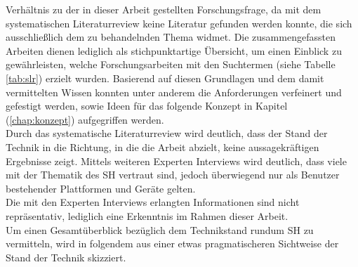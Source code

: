     Verhältnis zu der in dieser Arbeit gestellten Forschungsfrage, da mit dem systematischen Literaturreview keine Literatur 
    gefunden werden konnte, die sich ausschließlich dem zu behandelnden Thema widmet. Die zusammengefassten Arbeiten dienen 
    lediglich als stichpunktartige Übersicht, um einen Einblick zu gewährleisten, welche Forschungsarbeiten mit den 
    Suchtermen (siehe Tabelle \ref{tab:slr}) erzielt wurden. Basierend auf diesen Grundlagen und dem damit vermittelten Wissen 
    konnten unter anderem die Anforderungen verfeinert und gefestigt werden, sowie Ideen für das folgende Konzept in Kapitel 
    (\ref{chap:konzept}) aufgegriffen werden.
    \\ 
    Durch das systematische Literaturreview wird deutlich, dass der Stand der Technik in die Richtung, in die die Arbeit 
    abzielt, keine aussagekräftigen Ergebnisse zeigt. Mittels weiteren Experten Interviews wird deutlich, dass viele mit der 
    Thematik des \acl{SH} vertraut sind, jedoch überwiegend nur als Benutzer bestehender Plattformen und Geräte gelten.
    \\
    Die mit den Experten Interviews erlangten Informationen sind nicht repräsentativ, lediglich eine Erkenntnis im Rahmen 
    dieser Arbeit.
    \\
    Um einen Gesamtüberblick bezüglich dem Technikstand rundum \acl{SH} zu vermitteln, 
    wird in folgendem aus einer etwas pragmatischeren Sichtweise der Stand der Technik skizziert.
    
    \pagebreak
